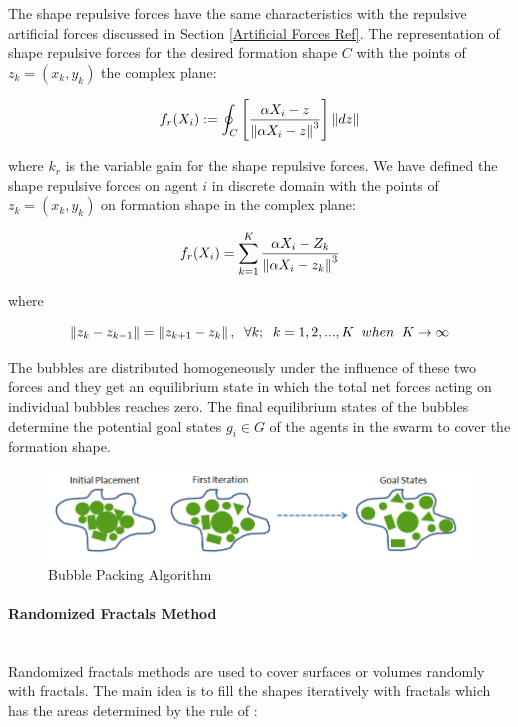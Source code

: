 The shape repulsive forces have the same characteristics with the repulsive artificial forces discussed in Section \ref{Artificial Forces Ref}. The representation of shape repulsive forces for the desired formation shape $C$ with the points of  $z_k = (x_k,y_k)$ the complex plane:
	
\begin{equation} \label{buble_repulsive}
f_r(X_i) := \oint_C \left[\frac{\alpha X_i - z}{\left\lVert\alpha X_i - z\right\rVert^3}\right] \left\lVert dz\right\rVert
\end{equation}

where $k_r$ is the variable gain for the shape repulsive forces. We have defined the shape repulsive forces on agent $i$ in discrete domain with the points of  $z_k = (x_k,y_k)$ on formation shape in the complex plane:

\begin{equation}
f_r(X_i) = \sum_{k=1}^{K} \frac{\alpha X_i - Z_k}{\left\lVert\alpha X_i - z_k\right\rVert^3}
\end{equation}
				
where

\begin{equation}
\left\lVert z_k - z_{k-1}\right\rVert = \left\lVert z_{k+1} - z_k\right\rVert, \hspace{0.2cm}  \forall k ;  \hspace{0.2cm} k=1,2,...,K \hspace{0.2cm} when  \hspace{0.2cm} K \to\infty					
\end{equation}
						

	
The bubbles are distributed homogeneously under the influence of these two forces and they get an equilibrium state in which the total net forces acting on individual bubbles reaches zero. The final equilibrium states of the bubbles determine the potential goal states $g_i \in G$  of the agents in the swarm to cover the formation shape. 

\begin{figure}[H]
\caption{Bubble Packing Algorithm}
\centering
\includegraphics[scale = 0.62]{bubble_packing2}
\end{figure}

\paragraph{Randomized Fractals Method}\hspace{0pt} \\
Randomized fractals methods are used to cover surfaces or volumes randomly with fractals. The main idea is to fill the shapes iteratively with fractals which has the areas determined by the rule of \cite{26} :

